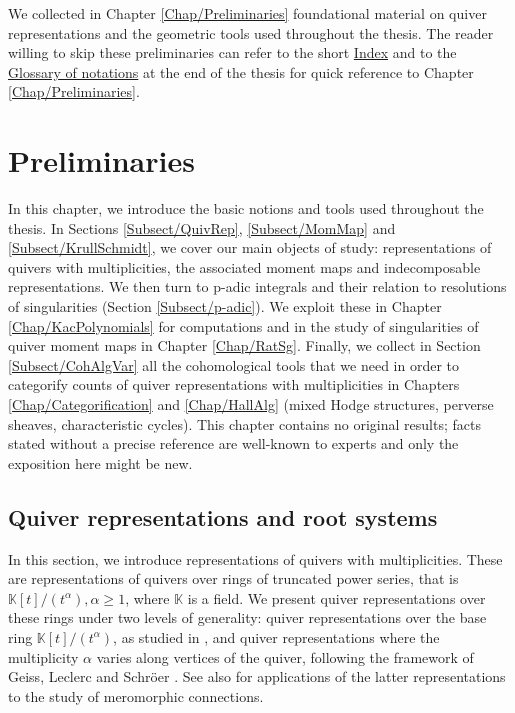 \documentclass[11pt,english]{article}
\numberwithin{equation}{section}
\numberwithin{figure}{section}
\theoremstyle{definition}
\theoremstyle{plain}
\theoremstyle{remark}
\newcommand\KK{\mathbb{K}}
\begin{document}
We collected in Chapter \ref{Chap/Preliminaries} foundational material
on quiver representations and the geometric tools used throughout
the thesis. The reader willing to skip these preliminaries can refer
to the short \hyperref[Section/indexTerms]{Index} and to the \hyperref[Section/indexNotations]{Glossary of notations}
at the end of the thesis for quick reference to Chapter \ref{Chap/Preliminaries}.

\pagebreak{}

\section{Preliminaries \label{Chap/Preliminaries}}

In this chapter, we introduce the basic notions and tools used throughout
the thesis. In Sections \ref{Subsect/QuivRep}, \ref{Subsect/MomMap}
and \ref{Subsect/KrullSchmidt}, we cover our main objects of study:
representations of quivers with multiplicities, the associated moment
maps and indecomposable representations. We then turn to p-adic integrals
and their relation to resolutions of singularities (Section \ref{Subsect/p-adic}).
We exploit these in Chapter \ref{Chap/KacPolynomials} for computations
and in the study of singularities of quiver moment maps in Chapter
\ref{Chap/RatSg}. Finally, we collect in Section \ref{Subsect/CohAlgVar}
all the cohomological tools that we need in order to categorify counts
of quiver representations with multiplicities in Chapters \ref{Chap/Categorification}
and \ref{Chap/HallAlg} (mixed Hodge structures, perverse sheaves,
characteristic cycles). This chapter contains no original results;
facts stated without a precise reference are well-known to experts
and only the exposition here might be new.

\subsection{Quiver representations and root systems \label{Subsect/QuivRep}}

In this section, we introduce representations of quivers with multiplicities.
These are representations of quivers over rings of truncated power
series, that is $\KK[t]/(t^{\alpha}),\alpha\geq1$, where $\KK$ is
a field. We present quiver representations over these rings under
two levels of generality: quiver representations over the base ring
$\KK[t]/(t^{\alpha})$, as studied in \cite{Wys17b,HLRV24}, and quiver
representations where the multiplicity $\alpha$ varies along vertices
of the quiver, following the framework of Geiss, Leclerc and Schröer
\cite{GLS17a}. See also \cite{Yam10,HWW23} for applications of the
latter representations to the study of meromorphic connections.
\end{document}
